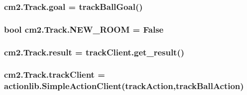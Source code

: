 \subsubsection[{\texorpdfstring{goal}{goal}}]{\setlength{\rightskip}{0pt plus 5cm}cm2.\+Track.\+goal = track\+Ball\+Goal()\hspace{0.3cm}{\ttfamily [static]}}\hypertarget{classcm2_1_1Track_a824b328a32300a27f384c32638533570}{}\label{classcm2_1_1Track_a824b328a32300a27f384c32638533570}
\subsubsection[{\texorpdfstring{N\+E\+W\+\_\+\+R\+O\+OM}{NEW_ROOM}}]{\setlength{\rightskip}{0pt plus 5cm}bool cm2.\+Track.\+N\+E\+W\+\_\+\+R\+O\+OM = False\hspace{0.3cm}{\ttfamily [static]}}\hypertarget{classcm2_1_1Track_a14f144ef7dbf58e82986fee9687d6a4a}{}\label{classcm2_1_1Track_a14f144ef7dbf58e82986fee9687d6a4a}
\subsubsection[{\texorpdfstring{result}{result}}]{\setlength{\rightskip}{0pt plus 5cm}cm2.\+Track.\+result = track\+Client.\+get\+\_\+result()\hspace{0.3cm}{\ttfamily [static]}}\hypertarget{classcm2_1_1Track_a9b07cd54eb054fe55a7224acacd19e5d}{}\label{classcm2_1_1Track_a9b07cd54eb054fe55a7224acacd19e5d}
\subsubsection[{\texorpdfstring{track\+Client}{trackClient}}]{\setlength{\rightskip}{0pt plus 5cm}cm2.\+Track.\+track\+Client = actionlib.\+Simple\+Action\+Client(\textquotesingle{}track\+Action\textquotesingle{},track\+Ball\+Action)\hspace{0.3cm}{\ttfamily [static]}}\hypertarget{classcm2_1_1Track_a02f4b58b488d60b1f9accac373a28dd1}{}\label{classcm2_1_1Track_a02f4b58b488d60b1f9accac373a28dd1}
